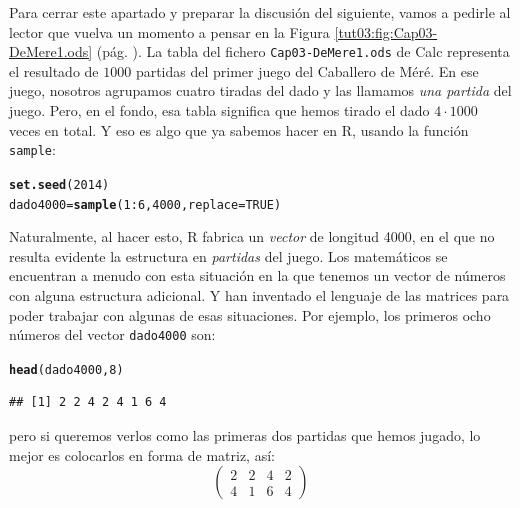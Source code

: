 \documentclass[10pt,a4paper]{article}\usepackage[]{graphicx}\usepackage[]{color}
\makeatletter
\newcommand{\hlnum}[1]{\textcolor[rgb]{0.686,0.059,0.569}{#1}}%
\newcommand{\hlopt}[1]{\textcolor[rgb]{0,0,0}{#1}}%
\newcommand{\hlstd}[1]{\textcolor[rgb]{0.345,0.345,0.345}{#1}}%
\newcommand{\hlkwb}[1]{\textcolor[rgb]{0.69,0.353,0.396}{#1}}%
\newcommand{\hlkwc}[1]{\textcolor[rgb]{0.333,0.667,0.333}{#1}}%
\newcommand{\hlkwd}[1]{\textcolor[rgb]{0.737,0.353,0.396}{\textbf{#1}}}%
\newenvironment{kframe}{%
 \def\at@end@of@kframe{}%
 \ifinner\ifhmode%
  \def\at@end@of@kframe{\end{minipage}}%
  \begin{minipage}{\columnwidth}%
 \fi\fi%
 \def\FrameCommand##1{\hskip\@totalleftmargin \hskip-\fboxsep
 \colorbox{shadecolor}{##1}\hskip-\fboxsep
     \hskip-\linewidth \hskip-\@totalleftmargin \hskip\columnwidth}%
 \MakeFramed {\advance\hsize-\width
   \@totalleftmargin\z@ \linewidth\hsize
   \@setminipage}}%
 {\par\unskip\endMakeFramed%
 \at@end@of@kframe}
\newenvironment{knitrout}{}{} %
\makeatother
\begin{document}
Para cerrar este apartado y preparar la discusión del siguiente, vamos a pedirle al lector que vuelva un momento a pensar en la Figura \ref{tut03:fig:Cap03-DeMere1.ods} (pág. \pageref{tut03:fig:Cap03-DeMere1.ods}). La tabla del fichero {\tt Cap03-DeMere1.ods} de Calc representa el resultado de $1000$ partidas del primer juego del Caballero de Méré. En ese juego, nosotros agrupamos cuatro tiradas del dado y las llamamos {\em una partida} del juego. Pero, en el fondo, esa tabla significa que hemos tirado el dado $4\cdot 1000$ veces en total. Y eso es algo que ya sabemos hacer en R, usando la función {\tt sample}:
\begin{knitrout}
\color{fgcolor}\begin{kframe}
\begin{alltt}
\hlkwd{set.seed}\hlstd{(}\hlnum{2014}\hlstd{)}
\hlstd{dado4000} \hlkwb{=} \hlkwd{sample}\hlstd{(}\hlnum{1}\hlopt{:}\hlnum{6}\hlstd{,} \hlnum{4000}\hlstd{,} \hlkwc{replace}\hlstd{=}\hlnum{TRUE}\hlstd{)}
\end{alltt}
\end{kframe}
\end{knitrout}
     Naturalmente, al hacer esto, R fabrica un {\em vector} de longitud 4000, en el que no resulta evidente la estructura en {\em partidas} del juego. Los matemáticos se encuentran a menudo con esta situación en la que tenemos un vector de números con alguna estructura adicional. Y han inventado el lenguaje de las matrices para poder trabajar con algunas de esas situaciones. Por ejemplo,
los primeros ocho números del vector {\tt dado4000} son:
\begin{knitrout}
\color{fgcolor}\begin{kframe}
\begin{alltt}
\hlkwd{head}\hlstd{(dado4000,} \hlnum{8}\hlstd{)}
\end{alltt}
\begin{verbatim}
## [1] 2 2 4 2 4 1 6 4
\end{verbatim}
\end{kframe}
\end{knitrout}
     pero si queremos verlos como las primeras dos partidas que hemos jugado, lo mejor es colocarlos en forma de matriz, así:
     \[
          \left(
               \begin{array}{cccc}
               2& 2& 4& 2\\
               4& 1& 6& 4
               \end{array}
               \right)
          \]
\end{document}
